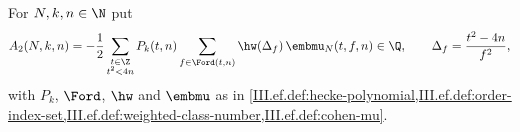 For $N,k,n\in\N$ put
\[
  A_2(N,k,n)=-\frac12\sum_{\substack{t\in\Z\\ t^2<4n}}P_k(t,n)\sum_{f\in\Ford(t,n)}\hw(\Delta_f)\,\embmu_N(t,f,n)\in\Q,\qquad \Delta_f=\frac{t^2-4n}{f^2},
\]
with $P_k$, $\Ford$, $\hw$ and $\embmu$ as in
\cref{III.ef.def:hecke-polynomial,III.ef.def:order-index-set,III.ef.def:weighted-class-number,III.ef.def:cohen-mu}.
